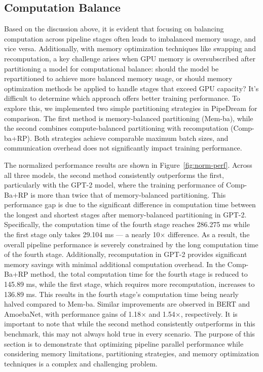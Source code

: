 \subsection{Computation Balance}
Based on the discussion above,
it is evident that focusing on balancing computation across pipeline stages
often leads to imbalanced memory usage, and vice versa.
Additionally, with memory optimization techniques like swapping and recomputation,
a key challenge arises when GPU memory is oversubscribed after partitioning a model for computational balance:
should the model be repartitioned to achieve more balanced memory usage,
or should memory optimization methods be applied to handle stages that exceed GPU capacity?
It’s difficult to determine which approach offers better training performance.
To explore this, we implemented two simple partitioning strategies in PipeDream for comparison.
The first method is memory-balanced partitioning (Mem-ba),
while the second combines compute-balanced partitioning with recomputation (Comp-ba+RP).
Both strategies achieve comparable maximum batch sizes,
and communication overhead does not significantly impact training performance.

The normalized performance results are shown in Figure~\ref{fig:norm-perf}.
Across all three models, the second method consistently outperforms the first,
particularly with the GPT-2 model,
where the training performance of Comp-Ba+RP is more than twice that of memory-balanced partitioning.
This performance gap is due to the significant difference in computation time between
the longest and shortest stages after memory-balanced partitioning in GPT-2.
Specifically, the computation time of the fourth stage reaches 286.275 ms
while the first stage only takes 29.104 ms — a nearly 10$\times$ difference.
As a result, the overall pipeline performance is severely constrained by the long computation time of the fourth stage.
Additionally, recomputation in GPT-2 provides significant memory savings with minimal additional computation overhead.
In the Comp-Ba+RP method, the total computation time for the fourth stage is reduced to 145.89 ms,
while the first stage, which requires more recomputation, increases to 136.89 ms.
This results in the fourth stage’s computation time being nearly halved compared to Mem-ba.
Similar improvements are observed in BERT and AmoebaNet, with performance gains of 1.18$\times$ and 1.54$\times$, respectively.
It is important to note that while the second method consistently outperforms in this benchmark,
this may not always hold true in every scenario.
The purpose of this section is to demonstrate that optimizing
pipeline parallel performance while considering memory limitations,
partitioning strategies, and memory optimization techniques is a complex and challenging problem.

